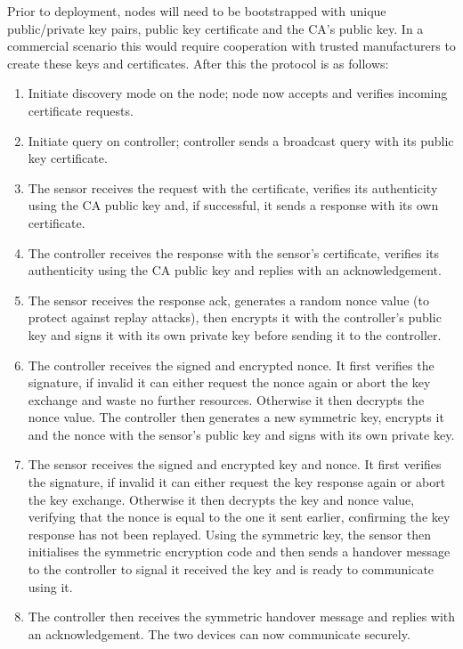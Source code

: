 \documentclass[conference]{./sty/IEEEtran}
\begin{document}
Prior to deployment, nodes will need to be bootstrapped with unique public/private key pairs, public key certificate and the CA's public key. In a commercial scenario this would require cooperation with trusted manufacturers to create these keys and certificates. After this the protocol is as follows:
\begin{enumerate}
  \item Initiate discovery mode on the node; node now accepts and verifies incoming certificate requests.
  \item Initiate query on controller; controller sends a broadcast query with its public key certificate.
  \item The sensor receives the request with the certificate, verifies its authenticity using the CA public key and, if successful, it sends a response with its own certificate.
  \item The controller receives the response with the sensor's certificate, verifies its authenticity using the CA public key and replies with an acknowledgement.
  \item The sensor receives the response ack, generates a random nonce value (to protect against replay attacks), then encrypts it with the controller's public key and signs it with its own private key before sending it to the controller.
  \item The controller receives the signed and encrypted nonce. It first verifies the signature, if invalid it can either request the nonce again or abort the key exchange and waste no further resources. Otherwise it then decrypts the nonce value. The controller then generates a new symmetric key, encrypts it and the nonce with the sensor's public key and signs with its own private key.
  \item The sensor receives the signed and encrypted key and nonce. It first verifies the signature, if invalid it can either request the key response again or abort the key exchange. Otherwise it then decrypts the key and nonce value, verifying that the nonce is equal to the one it sent earlier, confirming the key response has not been replayed. Using the symmetric key, the sensor then initialises the symmetric encryption code and then sends a handover message to the controller to signal it received the key and is ready to communicate using it.
  \item The controller then receives the symmetric handover message and replies with an acknowledgement. The two devices can now communicate securely.
\end{enumerate} 
\end{document}
